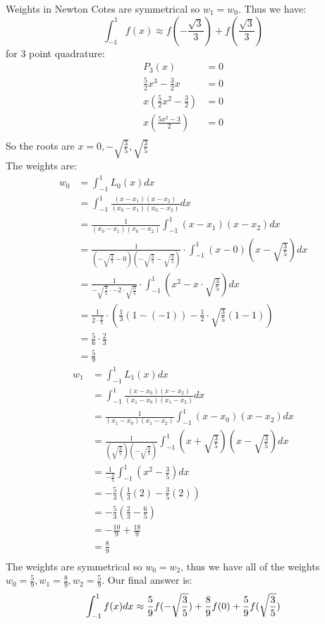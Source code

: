 \documentclass{article}
\begin{document}
Weights in Newton Cotes are symmetrical so $w_1 = w_0$. Thus we have: \\
\[
\int_{-1}^1f(x) \approx f(-\frac{\sqrt{3}}{3}) + f(\frac{\sqrt{3}}{3})
\]
for 3 point quadrature: \\
\begin{align*}
P_3(x) &= 0\\
\frac{5}{2}x^3 - \frac{3}{2}x &= 0\\
x(\frac{5}{2}x^2 - \frac{3}{2}) &= 0 \\
x(\frac{5x^2 - 3}{2}) &= 0 \\
\end{align*}
So the roots are $x = 0, -\sqrt{\frac{3}{5}}, \sqrt{\frac{3}{5}}$ \\
The weights are: \\
\begin{align*}
w_0 &= \int_{-1}^1L_0(x)dx \\
&= \int_{-1}^1 \frac{(x - x_1)(x - x_2)}{(x_0 - x_1)(x_0 - x_2)}dx \\
&= \frac{1}{(x_0 - x_1)(x_0 - x_2)}\int_{-1}^1(x - x_1)(x - x_2)dx \\
&= \frac{1}{(-\sqrt{\frac{3}{5}} - 0)(-\sqrt{\frac{3}{5}} - \sqrt{\frac{3}{5}})} \cdot \int_{-1}^1(x - 0)(x - \sqrt{\frac{3}{5}})dx \\
&= \frac{1}{-\sqrt{\frac{3}{5}} \cdot -2 \cdot \sqrt{\frac{3}{5}}} \cdot \int_{-1}^1(x^2 - x \cdot \sqrt{\frac{3}{5}})dx \\
&= \frac{1}{2 \cdot \frac{3}{5}} \cdot (\frac{1}{3}(1 - (-1)) - \frac{1}{2} \cdot \sqrt{\frac{3}{5}}(1 - 1)) \\
&= \frac{5}{6} \cdot \frac{2}{3} \\
&= \frac{5}{9}
\end{align*}
\begin{align*}
w_1 &= \int_{-1}^1L_1(x)dx \\
&= \int_{-1}^1 \frac{(x - x_0)(x - x_2)}{(x_1- x_0)(x_1 - x_2)}dx \\
&= \frac{1}{(x_1- x_0)(x_1 - x_2)} \int_{-1}^1 (x - x_0)(x - x_2)dx \\
&= \frac{1}{(\sqrt{\frac{3}{5}})(-\sqrt{\frac{3}{5}})} \int_{-1}^1 (x + \sqrt{\frac{3}{5}})(x - \sqrt{\frac{3}{5}})dx \\
&= \frac{1}{-\frac{3}{5}} \int_{-1}^1 (x^2 - \frac{3}{5})dx \\
&= -\frac{5}{3}(\frac{1}{3}(2) - \frac{3}{5}(2)) \\
&= -\frac{5}{3}(\frac{2}{3} - \frac{6}{5}) \\
&= -\frac{10}{9} + \frac{18}{9} \\
&= \frac{8}{9} \\
\end{align*}
The weights are symmetrical so $w_0 = w_2$, thus we have all of the weights $w_0 = \frac{5}{9}, w_1 = \frac{8}{9}, w_2 = \frac{5}{9}$. Our final answer is: \\
\[
\int_{-1}^1f(x)dx \approx \frac{5}{9}f(-\sqrt{\frac{3}{5}}) + \frac{8}{9}f(0) + \frac{5}{9}f(\sqrt{\frac{3}{5}}) \\
\]
\end{document}
